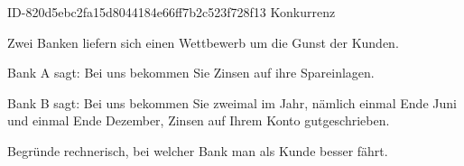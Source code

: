 \begin{exercise}
      {ID-820d5ebc2fa15d8044184e66ff7b2c523f728f13}
      {Konkurrenz}
  \ifproblem\problem\par
    Zwei Banken liefern sich einen Wettbewerb um die Gunst der
    Kunden.\par
    Bank A sagt: \glqq Bei uns bekommen Sie  Zinsen auf ihre
    Spareinlagen.\grqq\par
    Bank B sagt: \glqq Bei uns bekommen Sie zweimal im Jahr, nämlich einmal
    Ende Juni und einmal Ende Dezember,  Zinsen auf Ihrem Konto
    gutgeschrieben.\grqq\par
    Begründe rechnerisch, bei welcher Bank man als Kunde besser fährt.
  \fi
\end{exercise}
